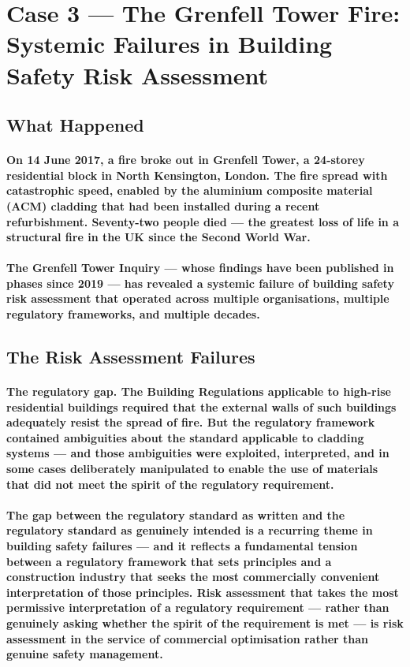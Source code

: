 \section{Case 3 — The Grenfell Tower Fire: Systemic Failures in Building Safety Risk Assessment}

\subsection{What Happened}
\paragraph{On 14 June 2017, a fire broke out in Grenfell Tower, a 24-storey residential block in North Kensington, London. The fire spread with catastrophic speed, enabled by the aluminium composite material (ACM) cladding that had been installed during a recent refurbishment. Seventy-two people died — the greatest loss of life in a structural fire in the UK since the Second World War.}
\paragraph{The Grenfell Tower Inquiry — whose findings have been published in phases since 2019 — has revealed a systemic failure of building safety risk assessment that operated across multiple organisations, multiple regulatory frameworks, and multiple decades.}

\subsection{The Risk Assessment Failures}
\paragraph{\textbf{The regulatory gap}. The Building Regulations applicable to high-rise residential buildings required that the external walls of such buildings adequately resist the spread of fire. But the regulatory framework contained ambiguities about the standard applicable to cladding systems — and those ambiguities were exploited, interpreted, and in some cases deliberately manipulated to enable the use of materials that did not meet the spirit of the regulatory requirement.}
\paragraph{The gap between the regulatory standard as written and the regulatory standard as genuinely intended is a recurring theme in building safety failures — and it reflects a fundamental tension between a regulatory framework that sets principles and a construction industry that seeks the most commercially convenient interpretation of those principles. Risk assessment that takes the most permissive interpretation of a regulatory requirement — rather than genuinely asking whether the spirit of the requirement is met — is risk assessment in the service of commercial optimisation rather than genuine safety management.}
